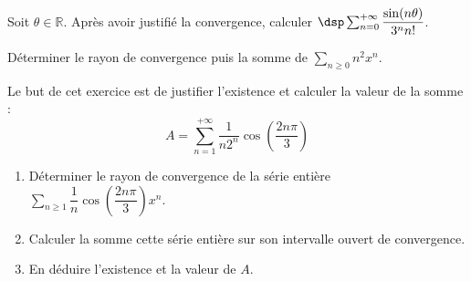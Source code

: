 \documentclass[a4paper,10pt]{report}
\newcommand{\Sum}[2]{\ensuremath{\textstyle{\sum\limits_{#1}^{#2}}}}
\begin{document}
\begin{Exa} Soit $\theta\in\mathbb{R}$. Après avoir justifié la convergence, calculer $\dsp\sum_{n=0}^{+\infty}\dfrac{\sin(n\theta)}{3^nn!}$.
\end{Exa}


\begin{Exa} Déterminer le rayon de convergence puis la somme de $\Sum{n \geq 0}{} n^2x^n$.
\end{Exa}

%
%

\begin{Exa}[\ding{80}] Le but de cet exercice est de justifier l'existence et calculer la valeur de la somme :  
\[
A=\sum_{n=1}^{+\infty}\dfrac{1}{n2^n}\cos\left(\dfrac{2n\pi}{3}\right)
\]
\begin{enumerate}
\item Déterminer le rayon de convergence de la série entière $\Sum{n \geq 1}{} \dfrac{1}{n}\cos\left(\dfrac{2n\pi}{3}\right)x^n$.
\item Calculer la somme cette série entière sur son intervalle ouvert de convergence.
\item En déduire l'existence et la valeur de $A$.
\end{enumerate}
\end{Exa}
\end{document}
